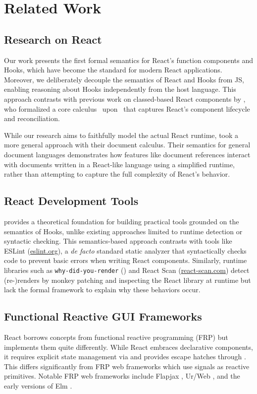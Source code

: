 \chapter{Related Work}\label{chap:related}
\section{Research on React}
Our work presents the first formal semantics for React's function components and Hooks, which have become the standard for modern React applications.
Moreover, we deliberately decouple the semantics of React and Hooks from JS, enabling reasoning about Hooks independently from the host language.
This approach contrasts with previous work on classed-based React components by \citet{MadLhoTip20Semantics}, who formalized a core calculus~\Lreact{} upon~\Ljs{} \citep{GuhSafKri10Essence} that captures React's component lifecycle and reconciliation.

While our research aims to faithfully model the actual React runtime, \citet{CriKri24Core} took a more general approach with their document calculus.
Their semantics for general document languages demonstrates how features like document references interact with documents written in a React-like language using a simplified runtime, rather than attempting to capture the full complexity of React's behavior.


\section{React Development Tools}
\Rtrace{} provides a theoretical foundation for building practical tools grounded on the semantics of Hooks, unlike existing approaches limited to runtime detection or syntactic checking.
This semantics-based approach contrasts with tools like ESLint (\href{https://eslint.org}{eslint.org}), a \emph{de facto} standard static analyzer that syntactically checks code to prevent basic errors when writing React components.
Similarly, runtime libraries such as \texttt{why-did-you-render} (\href{https://github.com/welldone-software/why-did-you-render}{}) and React Scan (\href{https://react-scan.com/}{react-scan.com}) detect (re-)renders by monkey patching and inspecting the React library at runtime but lack the formal framework to explain why these behaviors occur.


\section{Functional Reactive GUI Frameworks}
React borrows concepts from functional reactive programming (FRP) \citep{EllHud97Functional} but implements them quite differently.
While React embraces declarative components, it requires explicit state management via  and provides escape hatches through .
This differs significantly from FRP web frameworks which use signals as reactive primitives.
Notable FRP web frameworks include Flapjax \citep{MeyGuhBasCooGreBroKri09Flapjax}, Ur/Web \citep{Chl15UrWeb,Chl15Optimizing}, and the early versions of Elm \citep{CzaCho13Asynchronous}. %

